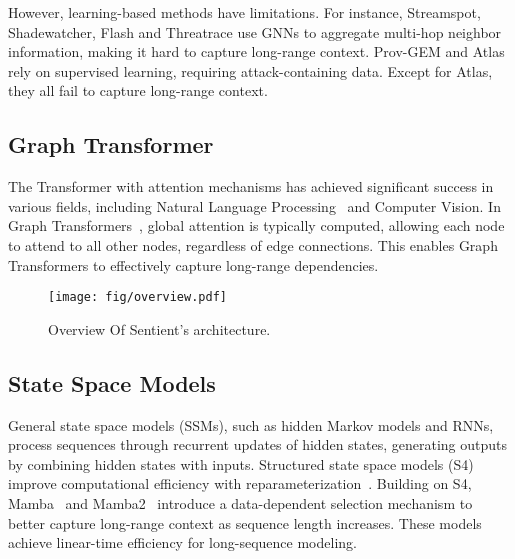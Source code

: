 However, learning-based methods have limitations. For instance, Streamspot, Shadewatcher, Flash and Threatrace use GNNs to aggregate multi-hop neighbor information, making it hard to capture long-range context. Prov-GEM and Atlas rely on supervised learning, requiring attack-containing data. Except for Atlas, they all fail to capture long-range context.

\subsection{Graph Transformer}

The Transformer with attention mechanisms has achieved significant success in various fields, including Natural Language Processing~\cite{vaswani2017attention} and Computer Vision. In Graph Transformers~\cite{dwivedi2021generalization}, global attention is typically computed, allowing each node to attend to all other nodes, regardless of edge connections. This enables Graph Transformers to effectively capture long-range dependencies.

\begin{figure*}[ht]
    \centering
    \texttt{[image: fig/overview.pdf]}
    \caption{Overview Of Sentient's architecture.}
    \label{fig:Overview}
    \vspace{-0.1in} 
\end{figure*}

\subsection{State Space Models}
General state space models (SSMs), such as hidden Markov models and RNNs, process sequences through recurrent updates of hidden states, generating outputs by combining hidden states with inputs. Structured state space models (S4) improve computational efficiency with reparameterization~\cite{gu2021efficiently}.
Building on S4, Mamba~\cite{gu2023mamba} and Mamba2~\cite{dao2024transformers} introduce a data-dependent selection mechanism to better capture long-range context as sequence length increases. These models achieve linear-time efficiency for long-sequence modeling.
